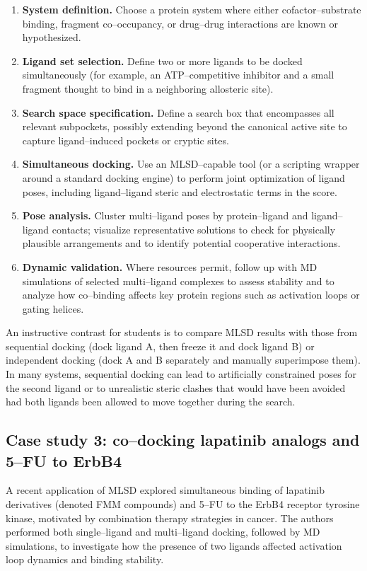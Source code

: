 \documentclass[12pt]{article}
\begin{document}
\begin{enumerate}
  \item \textbf{System definition.} Choose a protein system where either cofactor–substrate binding, fragment co–occupancy, or drug–drug interactions are known or hypothesized.  
  \item \textbf{Ligand set selection.} Define two or more ligands to be docked simultaneously (for example, an ATP–competitive inhibitor and a small fragment thought to bind in a neighboring allosteric site).  
  \item \textbf{Search space specification.} Define a search box that encompasses all relevant subpockets, possibly extending beyond the canonical active site to capture ligand–induced pockets or cryptic sites.  
  \item \textbf{Simultaneous docking.} Use an MLSD–capable tool (or a scripting wrapper around a standard docking engine) to perform joint optimization of ligand poses, including ligand–ligand steric and electrostatic terms in the score.  
  \item \textbf{Pose analysis.} Cluster multi–ligand poses by protein–ligand and ligand–ligand contacts; visualize representative solutions to check for physically plausible arrangements and to identify potential cooperative interactions.  
  \item \textbf{Dynamic validation.} Where resources permit, follow up with MD simulations of selected multi–ligand complexes to assess stability and to analyze how co–binding affects key protein regions such as activation loops or gating helices.
\end{enumerate}

An instructive contrast for students is to compare MLSD results with those from sequential docking (dock ligand A, then freeze it and dock ligand B) or independent docking (dock A and B separately and manually superimpose them).  
In many systems, sequential docking can lead to artificially constrained poses for the second ligand or to unrealistic steric clashes that would have been avoided had both ligands been allowed to move together during the search.\cite{CH14_MLSD2010,CH14_Moldina2025}

\subsection{Case study 3: co–docking lapatinib analogs and 5–FU to ErbB4}

A recent application of MLSD explored simultaneous binding of lapatinib derivatives (denoted FMM compounds) and 5–FU to the ErbB4 receptor tyrosine kinase, motivated by combination therapy strategies in cancer. 
The authors performed both single–ligand and multi–ligand docking, followed by MD simulations, to investigate how the presence of two ligands affected activation loop dynamics and binding stability.\cite{CH14_ErbB4MLSD2024}
\end{document}
